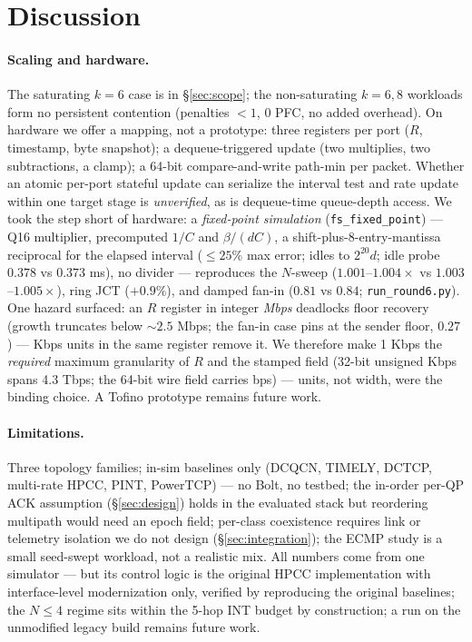 \documentclass[sigconf, nonacm]{acmart}
\begin{document}
\section{Discussion}
\label{sec:discussion}

\paragraph{Scaling and hardware.} The saturating $k{=}6$ case is in \S\ref{sec:scope}; the non-saturating $k = 6, 8$
workloads form no persistent contention (penalties ${<}1$, 0 PFC, no added overhead). On
hardware we offer a mapping, not a prototype: three registers per port ($R$, timestamp,
byte snapshot); a dequeue-triggered update (two multiplies, two subtractions, a clamp); a
64-bit compare-and-write path-min per packet.
Whether an atomic per-port stateful update can serialize the interval test and rate update
within one target stage is \emph{unverified}, as is dequeue-time queue-depth access. We took the step short of hardware: a
\emph{fixed-point simulation} (\texttt{fs\_fixed\_point}) --- Q16 multiplier, precomputed
$1/C$ and $\beta/(dC)$, a shift-plus-8-entry-mantissa reciprocal for the elapsed interval
($\le 25\%$ max error; idles to $2^{20} d$; idle probe $0.378$ vs $0.373$ ms), no
divider
--- reproduces the $N$-sweep ($1.001$--$1.004\times$ vs $1.003$--$1.005\times$), ring JCT
($+0.9\%$), and damped fan-in ($0.81$ vs $0.84$; \texttt{run\_round6.py}). One hazard surfaced: an $R$ register in integer
\emph{Mbps} deadlocks floor recovery (growth truncates below ${\sim}2.5$ Mbps; the fan-in
case pins at the sender floor, $0.27$) --- Kbps units in the same register remove it. We therefore make 1 Kbps the \emph{required} maximum
granularity of $R$ and the stamped field (32-bit unsigned Kbps spans 4.3 Tbps; the 64-bit
wire field carries bps) --- units, not width, were the binding choice. A Tofino prototype
remains future work.

\paragraph{Limitations.} Three topology families; in-sim baselines only (DCQCN, TIMELY, DCTCP,
multi-rate HPCC, PINT, PowerTCP) --- no Bolt, no testbed; the in-order per-QP ACK assumption
(\S\ref{sec:design}) holds in the evaluated stack but reordering multipath would need an
epoch field; per-class
coexistence requires link or telemetry isolation we do not design
(\S\ref{sec:integration}); the ECMP study is a small seed-swept workload, not a realistic
mix.
All numbers come from one simulator --- but its control logic is the original HPCC
implementation with interface-level modernization only, verified by reproducing the original
baselines; the $N \le 4$ regime sits within the 5-hop INT budget by construction; a run on
the unmodified legacy build remains future work.
\end{document}
